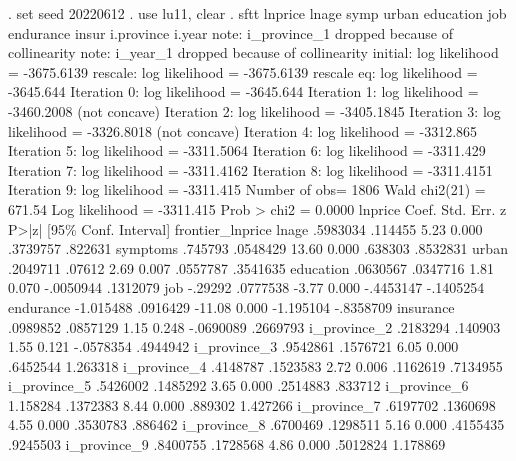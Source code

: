 . set seed 20220612
{\smallskip}
. use lu11, clear
{\smallskip}
. sftt lnprice lnage symp urban education job endurance insur i.province i.year
note: i_province_1 dropped because of collinearity
note: i_year_1 dropped because of collinearity
{\smallskip}
initial:       log likelihood = -3675.6139
rescale:       log likelihood = -3675.6139
rescale eq:    log likelihood =  -3645.644
Iteration 0:   log likelihood =  -3645.644  
Iteration 1:   log likelihood = -3460.2008  (not concave)
Iteration 2:   log likelihood = -3405.1845  
Iteration 3:   log likelihood = -3326.8018  (not concave)
Iteration 4:   log likelihood =  -3312.865  
Iteration 5:   log likelihood = -3311.5064  
Iteration 6:   log likelihood =  -3311.429  
Iteration 7:   log likelihood = -3311.4162  
Iteration 8:   log likelihood = -3311.4151  
Iteration 9:   log likelihood =  -3311.415  
{\smallskip}
{}Number of obs=       1806
                                                  Wald chi2(21)   =     671.54
Log likelihood =  -3311.415                       Prob > chi2     =     0.0000
{\smallskip}
         lnprice {\VBAR}      Coef.   Std. Err.      z    P>|z|     [95\% Conf. Interval]
frontier_lnprice {\VBAR}
           lnage {\VBAR}   .5983034    .114455     5.23   0.000     .3739757     .822631
        symptoms {\VBAR}    .745793   .0548429    13.60   0.000      .638303    .8532831
           urban {\VBAR}   .2049711     .07612     2.69   0.007     .0557787    .3541635
       education {\VBAR}   .0630567   .0347716     1.81   0.070    -.0050944    .1312079
             job {\VBAR}    -.29292   .0777538    -3.77   0.000    -.4453147   -.1405254
       endurance {\VBAR}  -1.015488   .0916429   -11.08   0.000    -1.195104   -.8358709
       insurance {\VBAR}   .0989852   .0857129     1.15   0.248    -.0690089    .2669793
    i_province_2 {\VBAR}   .2183294    .140903     1.55   0.121    -.0578354    .4944942
    i_province_3 {\VBAR}   .9542861   .1576721     6.05   0.000     .6452544    1.263318
    i_province_4 {\VBAR}   .4148787   .1523583     2.72   0.006     .1162619    .7134955
    i_province_5 {\VBAR}   .5426002   .1485292     3.65   0.000     .2514883     .833712
    i_province_6 {\VBAR}   1.158284   .1372383     8.44   0.000      .889302    1.427266
    i_province_7 {\VBAR}   .6197702   .1360698     4.55   0.000     .3530783     .886462
    i_province_8 {\VBAR}   .6700469   .1298511     5.16   0.000     .4155435    .9245503
    i_province_9 {\VBAR}   .8400755   .1728568     4.86   0.000     .5012824    1.178869
